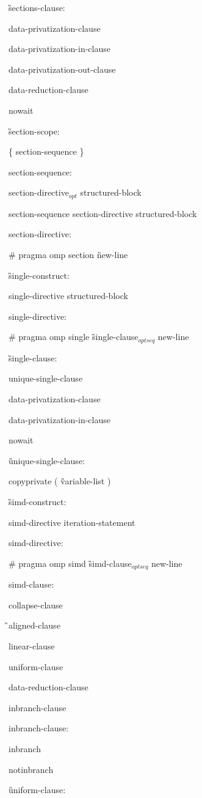 {\G sections-clause:

\I data-privatization-clause 

\I data-privatization-in-clause 

\I data-privatization-out-clause 

\I data-reduction-clause 

\C\I nowait

\G section-scope:

\I \{ section-sequence \}

section-sequence:

\I section-directive$_{opt}$ structured-block

\I section-sequence section-directive structured-block

section-directive:

\C\I \# pragma omp section \G new-line

\G single-construct:

\I single-directive structured-block

single-directive:

\C\I \# pragma omp single \G single-clause$_{optseq}$ new-line

\G single-clause:

\I unique-single-clause

\I data-privatization-clause

\I data-privatization-in-clause

\C\I nowait

\G unique-single-clause:

\C\I copyprivate ( \G variable-list \C )

\G simd-construct:

\I simd-directive iteration-statement

simd-directive:

\C\I \# pragma omp simd \G simd-clause$_{optseq}$ new-line

simd-clause:

\I collapse-clause

\G\I aligned-clause

\I linear-clause

\I uniform-clause

\I data-reduction-clause

\I inbranch-clause

inbranch-clause:

\C\I inbranch

\I notinbranch

\G uniform-clause:

}
